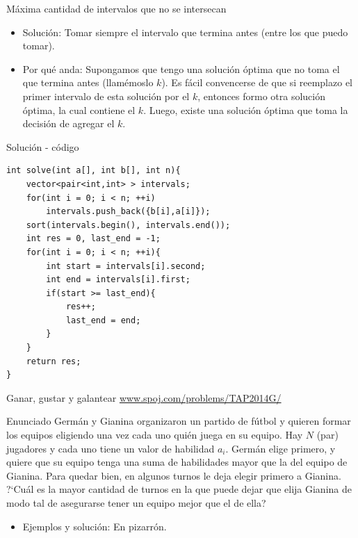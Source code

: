 \documentclass{beamer}
\begin{document}
\begin{frame}{M\'axima cantidad de intervalos que no se intersecan}
\begin{itemize}
\item
Soluci\'on: Tomar siempre el intervalo que termina antes (entre los que puedo tomar).
\item
Por qu\'e anda: Supongamos que tengo una soluci\'on \'optima que no toma el que termina antes (llam\'emoslo $k$). Es f\'acil convencerse de que si reemplazo el primer intervalo de esta soluci\'on por el $k$, entonces formo otra soluci\'on \'optima, la cual contiene el $k$. Luego, existe una soluci\'on \'optima que toma la decisi\'on de agregar el $k$.
\end{itemize}

\end{frame}

\begin{frame}[fragile]{Soluci\'on - c\'odigo}
\begin{lstlisting}
int solve(int a[], int b[], int n){
	vector<pair<int,int> > intervals;
	for(int i = 0; i < n; ++i)
		intervals.push_back({b[i],a[i]});
	sort(intervals.begin(), intervals.end());
	int res = 0, last_end = -1;
	for(int i = 0; i < n; ++i){
		int start = intervals[i].second;
		int end = intervals[i].first;
		if(start >= last_end){
			res++;
			last_end = end;
		}
	}
	return res;
}
\end{lstlisting}
\end{frame}

\begin{frame}{Ganar, gustar y galantear}
\url{www.spoj.com/problems/TAP2014G/}
\begin{block}{Enunciado}
Germ\'an y Gianina organizaron un partido de f\'utbol y quieren formar los equipos eligiendo una vez cada uno qui\'en juega en su equipo. Hay $N$ (par) jugadores y cada uno tiene un valor de habilidad $a_i$.
Germ\'an elige primero, y quiere que su equipo tenga una suma de habilidades mayor que la del equipo de Gianina. Para quedar bien, en algunos turnos le deja elegir primero a Gianina. ?`Cuál es la mayor cantidad de turnos en la que puede dejar que elija Gianina de modo tal de asegurarse tener un equipo mejor que el de ella?
\end{block}
\begin{itemize}
\item
Ejemplos y soluci\'on: En pizarr\'on.
\end{itemize}
\end{frame}
\end{document}
